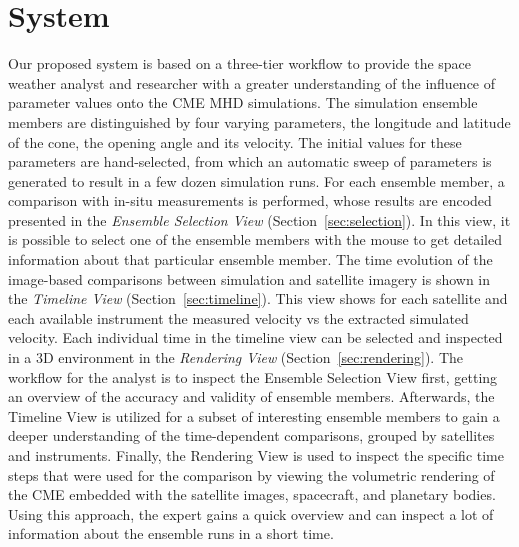 \documentclass[journal]{vgtc}                %
\begin{document}

\section{System}
Our proposed system is based on a three-tier workflow to provide the space weather analyst and researcher with a greater understanding of the influence of parameter values onto the CME MHD simulations. The simulation ensemble members are distinguished by four varying parameters, the longitude and latitude of the cone, the opening angle and its velocity. The initial values for these parameters are hand-selected, from which an automatic sweep of parameters is generated to result in a few dozen simulation runs. For each ensemble member, a comparison with in-situ measurements is performed, whose results are encoded presented in the \emph{Ensemble Selection View} (Section~\ref{sec:selection}). In this view, it is possible to select one of the ensemble members with the mouse to get detailed information about that particular ensemble member. The time evolution of the image-based comparisons between simulation and satellite imagery is shown in the \emph{Timeline View} (Section~\ref{sec:timeline}). This view shows for each satellite and each available instrument the measured velocity vs the extracted simulated velocity. Each individual time in the timeline view can be selected and inspected in a 3D environment in the \emph{Rendering View} (Section~\ref{sec:rendering}). The workflow for the analyst is to inspect the Ensemble Selection View first, getting an overview of the accuracy and validity of ensemble members. Afterwards, the Timeline View is utilized for a subset of interesting ensemble members to gain a deeper understanding of the time-dependent comparisons, grouped by satellites and instruments. Finally, the Rendering View is used to inspect the specific time steps that were used for the comparison by viewing the volumetric rendering of the CME embedded with the satellite images, spacecraft, and planetary bodies. Using this approach, the expert gains a quick overview and can inspect a lot of information about the ensemble runs in a short time.
\end{document}
